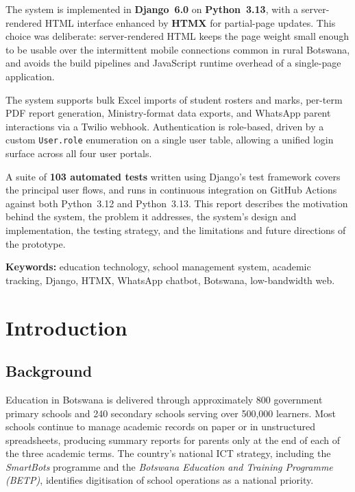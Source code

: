 \documentclass[11pt,a4paper]{article}
\begin{document}
The system is implemented in \textbf{Django~6.0} on \textbf{Python~3.13}, with a
server-rendered HTML interface enhanced by \textbf{HTMX} for partial-page
updates. This choice was deliberate: server-rendered HTML keeps the page weight
small enough to be usable over the intermittent mobile connections common in
rural Botswana, and avoids the build pipelines and JavaScript runtime overhead
of a single-page application.

The system supports bulk Excel imports of student rosters and marks, per-term
PDF report generation, Ministry-format data exports, and WhatsApp parent
interactions via a Twilio webhook. Authentication is role-based, driven by a
custom \texttt{User.role} enumeration on a single user table, allowing a unified
login surface across all four user portals.

A suite of \textbf{103 automated tests} written using Django's test framework
covers the principal user flows, and runs in continuous integration on GitHub
Actions against both Python~3.12 and Python~3.13. This report describes the
motivation behind the system, the problem it addresses, the system's design and
implementation, the testing strategy, and the limitations and future directions
of the prototype.

\vspace{0.5cm}
\noindent\textbf{Keywords:} education technology, school management system,
academic tracking, Django, HTMX, WhatsApp chatbot, Botswana, low-bandwidth web.

\newpage

\tableofcontents
\newpage

\section{Introduction}

\subsection{Background}

Education in Botswana is delivered through approximately 800 government primary
schools and 240 secondary schools serving over 500{,}000 learners. Most schools
continue to manage academic records on paper or in unstructured spreadsheets,
producing summary reports for parents only at the end of each of the three
academic terms. The country's national ICT strategy, including the
\textit{SmartBots} programme and the \textit{Botswana Education and Training
Programme (BETP)}, identifies digitisation of school operations as a national
priority.
\end{document}

